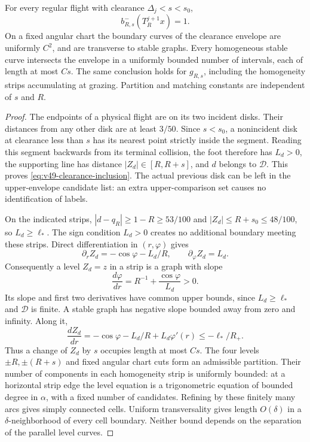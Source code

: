 \begin{lemma}
\label{lem:v49-physical-envelope}
For every regular flight with clearance $\Delta_j<s<s_0$,
\begin{equation}\label{eq:v49-clearance-inclusion}
 b_{R,s}^-(T_R^{j+1}x)=1.
\end{equation}
On a fixed angular chart the boundary curves of the clearance
envelope are uniformly $C^2$, and are transverse to stable graphs.
Every homogeneous stable curve intersects the envelope in a uniformly
bounded number of intervals, each of length at most $Cs$. The same
conclusion holds for $g_{R,s}$, including the homogeneity strips
accumulating at grazing. Partition and matching constants are
independent of $s$ and $R$.
\end{lemma}
\begin{proof}
The endpoints of a physical flight are on its two incident disks.
Their distances from any other disk are at least $3/50$. Since
$s<s_0$, a nonincident disk at clearance less than $s$ has its nearest
point strictly inside the segment. Reading this segment backwards
from its terminal collision, the foot therefore has $L_d>0$, the
supporting line has distance $|Z_d|\in[R,R+s]$, and $d$ belongs to
$\mathcal D$. This proves \eqref{eq:v49-clearance-inclusion}. The
actual previous disk can be left in the upper-envelope candidate
list: an extra upper-comparison set causes no identification of labels.

On the indicated strips, $|d-q_R|\ge1-R\ge53/100$ and
$|Z_d|\le R+s_0\le48/100$, so $L_d\ge\ell_*$. The sign condition
$L_d>0$ creates no additional boundary meeting these strips.
Direct differentiation in $(r,\varphi)$ gives
\begin{equation}\label{eq:v49-transverse-derivatives}
 \partial_r Z_d=-\cos\varphi-L_d/R,
 \qquad \partial_\varphi Z_d=L_d.
\end{equation}
Consequently a level $Z_d=z$ in a strip is a graph with slope
\[
 \frac{d\varphi}{dr}=R^{-1}+\frac{\cos\varphi}{L_d}>0.
\]
Its slope and first two derivatives have common upper bounds, since
$L_d\ge\ell_*$ and $\mathcal D$ is finite. A stable graph has negative
slope bounded away from zero and infinity. Along it,
\[
 \frac{dZ_d}{dr}=-\cos\varphi-L_d/R+L_d\varphi'(r)
                  \le-\ell_*/R_+.
\]
Thus a change of $Z_d$ by $s$ occupies length at most $Cs$.
The four levels $\pm R,\pm(R+s)$ and fixed angular chart cuts form
an admissible partition. Their number of components in each
homogeneity strip is uniformly bounded: at a horizontal strip edge
the level equation is a trigonometric equation of bounded degree in
$\alpha$, with a fixed number of candidates. Refining by these finitely
many arcs gives simply connected cells. Uniform transversality gives
length $O(\delta)$ in a $\delta$-neighborhood of every cell boundary.
Neither bound depends on the separation of the parallel level curves.


\end{proof}
